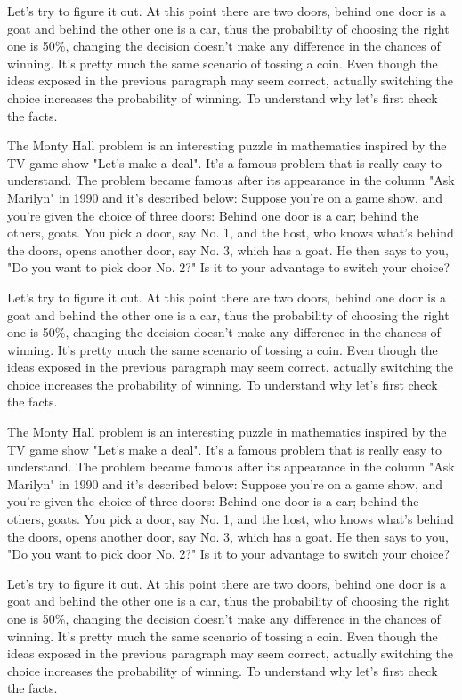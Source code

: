 \documentclass{oscmjournal}
\begin{document}
Let's try to figure it out. At this point there are two doors, behind one door is a goat  and behind the other one is a car, thus the probability of choosing the right one is 50\%, changing the decision doesn't make any difference in the chances of winning. It's pretty much the same scenario of tossing a coin. Even though the ideas exposed in the previous paragraph may seem correct, actually switching the choice increases the probability of winning. To understand why let's  first check the facts.

The Monty Hall problem is an interesting puzzle in mathematics inspired by the TV  game show "Let's make a deal". It's a famous problem that is really easy to understand. The problem became famous after its appearance in the column "Ask Marilyn" in 1990 and  it's described below: Suppose you're on a game show, and you're given the choice of three doors: Behind one  door is a car; behind the others, goats. You pick a door, say No. 1, and the host, who  knows what's behind the doors, opens another door, say No. 3, which has a goat. He then  says to you, "Do you want to pick door No. 2?" Is it to your advantage to switch your choice?

Let's try to figure it out. At this point there are two doors, behind one door is a goat  and behind the other one is a car, thus the probability of choosing the right one is 50\%, changing the decision doesn't make any difference in the chances of winning. It's pretty much the same scenario of tossing a coin. Even though the ideas exposed in the previous paragraph may seem correct, actually switching the choice increases the probability of winning. To understand why let's  first check the facts.

The Monty Hall problem is an interesting puzzle in mathematics inspired by the TV  game show "Let's make a deal". It's a famous problem that is really easy to understand. The problem became famous after its appearance in the column "Ask Marilyn" in 1990 and  it's described below: Suppose you're on a game show, and you're given the choice of three doors: Behind one  door is a car; behind the others, goats. You pick a door, say No. 1, and the host, who  knows what's behind the doors, opens another door, say No. 3, which has a goat. He then  says to you, "Do you want to pick door No. 2?" Is it to your advantage to switch your choice?

Let's try to figure it out. At this point there are two doors, behind one door is a goat  and behind the other one is a car, thus the probability of choosing the right one is 50\%, changing the decision doesn't make any difference in the chances of winning. It's pretty much the same scenario of tossing a coin. Even though the ideas exposed in the previous paragraph may seem correct, actually switching the choice increases the probability of winning. To understand why let's  first check the facts.




\end{document}
